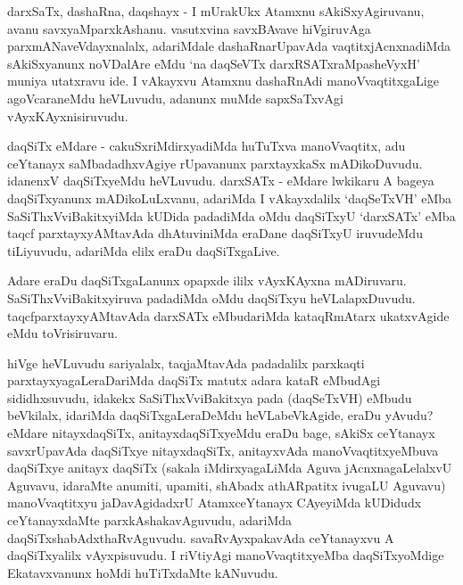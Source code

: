 \begin{artha}
darxSaTx, dashaRna, daqshayx - I mUrakUkx Atamxnu sAkiSxyAgiruvanu, avanu savxyaMparxkAshanu. vasutxvina savxBAvave hiVgiruvAga parxmANaveVdayxnalalx, adariMdale dashaRnarUpavAda vaqtitxjAcnxnadiMda sAkiSxyanunx noVDalAre eMdu `na daqSeVTx darxRSATxraMpasheVyxH' muniya utatxravu ide. I vAkayxvu Atamxnu dashaRnAdi manoVvaqtitxgaLige agoVcaraneMdu heVLuvudu, adanunx muMde sapxSaTxvAgi vAyxKAyxnisiruvudu.
\end{artha}


\begin{artha}
daqSiTx eMdare - cakuSxriMdirxyadiMda huTuTxva manoVvaqtitx, adu ceYtanayx saMbadadhxvAgiye rUpavanunx parxtayxkaSx mADikoDuvudu. idanenxV daqSiTxyeMdu heVLuvudu. darxSATx - eMdare lwkikaru A bageya daqSiTxyanunx mADikoLuLxvanu, adariMda I vAkayxdalilx `daqSeTxVH' eMba SaSiThxVviBakitxyiMda kUDida padadiMda oMdu daqSiTxyU `darxSATx' eMba taqcf parxtayxyAMtavAda dhAtuviniMda eraDane daqSiTxyU iruvudeMdu tiLiyuvudu, adariMda elilx eraDu daqSiTxgaLive.
\end{artha}


\begin{artha}
Adare eraDu daqSiTxgaLanunx opapxde ililx vAyxKAyxna mADiruvaru. SaSiThxVviBakitxyiruva padadiMda oMdu daqSiTxyu heVLalapxDuvudu. taqcfparxtayxyAMtavAda darxSATx eMbudariMda kataqRmAtarx ukatxvAgide eMdu toVrisiruvaru.
\end{artha}


\begin{artha}
hiVge heVLuvudu sariyalalx, taqjaMtavAda padadalilx parxkaqti parxtayxyagaLeraDariMda daqSiTx matutx adara kataR eMbudAgi sididhxsuvudu, idakekx SaSiThxVviBakitxya pada (daqSeTxVH) eMbudu beVkilalx, idariMda daqSiTxgaLeraDeMdu heVLabeVkAgide, eraDu yAvudu? eMdare nitayxdaqSiTx, anitayxdaqSiTxyeMdu eraDu bage, sAkiSx ceYtanayx savxrUpavAda daqSiTxye nitayxdaqSiTx, anitayxvAda manoVvaqtitxyeMbuva daqSiTxye anitayx daqSiTx (sakala iMdirxyagaLiMda Aguva jAcnxnagaLelalxvU Aguvavu, idaraMte anumiti, upamiti, shAbadx athARpatitx ivugaLU Aguvavu) manoVvaqtitxyu jaDavAgidadxrU AtamxceYtanayx CAyeyiMda kUDidudx ceYtanayxdaMte parxkAshakavAguvudu, adariMda daqSiTxshabAdxthaRvAguvudu. savaRvAyxpakavAda ceYtanayxvu A daqSiTxyalilx vAyxpisuvudu. I riVtiyAgi manoVvaqtitxyeMba daqSiTxyoMdige Ekatavxvanunx hoMdi huTiTxdaMte kANuvudu.
\end{artha}

